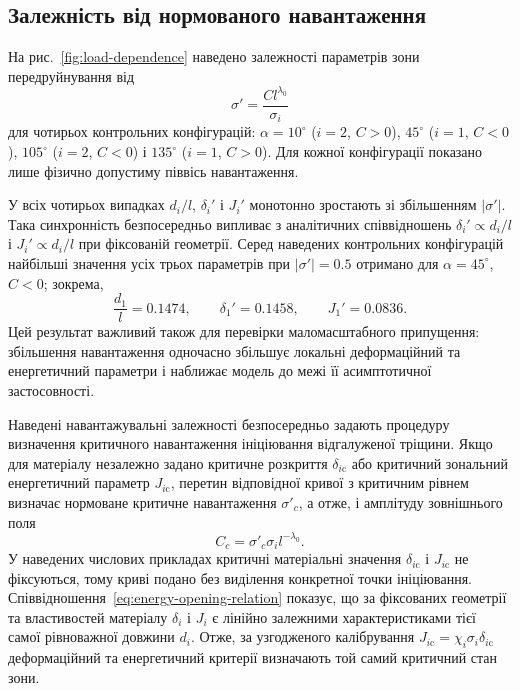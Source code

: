 \subsection{Залежність від нормованого навантаження}
\label{subsec:figure2}

На рис.~\ref{fig:load-dependence} наведено залежності параметрів зони
передруйнування від
\begin{equation*}
  \sigma'=\frac{Cl^{\lambda_0}}{\sigma_i}
\end{equation*}
для чотирьох контрольних конфігурацій:
$\alpha=10^\circ$ ($i=2$, $C>0$),
$45^\circ$ ($i=1$, $C<0$),
$105^\circ$ ($i=2$, $C<0$) і
$135^\circ$ ($i=1$, $C>0$). Для кожної конфігурації показано лише
фізично допустиму піввісь навантаження.


У всіх чотирьох випадках $d_i/l$, $\delta_i'$ і $J_i'$ монотонно
зростають зі збільшенням $|\sigma'|$. Така синхронність безпосередньо
випливає з аналітичних співвідношень
$\delta_i'\propto d_i/l$ і $J_i'\propto d_i/l$ при фіксованій
геометрії. Серед наведених контрольних конфігурацій найбільші значення
усіх трьох параметрів при $|\sigma'|=0.5$ отримано для
$\alpha=45^\circ$, $C<0$; зокрема,
\begin{equation*}
  \frac{d_1}{l}=0.1474,\qquad
  \delta_1'=0.1458,\qquad
  J_1'=0.0836.
\end{equation*}
Цей результат важливий також для перевірки маломасштабного припущення:
збільшення навантаження одночасно збільшує локальні деформаційний та
енергетичний параметри і наближає модель до межі її асимптотичної
застосовності.

Наведені навантажувальні залежності безпосередньо задають процедуру
визначення критичного навантаження ініціювання відгалуженої тріщини.
Якщо для матеріалу незалежно задано критичне розкриття
$\delta_{i\mathrm{c}}$ або критичний зональний енергетичний параметр
$J_{i\mathrm{c}}$, перетин відповідної кривої з критичним рівнем
визначає нормоване критичне навантаження $\sigma'_c$, а отже, і
амплітуду зовнішнього поля
\begin{equation*}
  C_c=\sigma'_c\sigma_i l^{-\lambda_0}.
\end{equation*}
У наведених числових прикладах критичні матеріальні значення
$\delta_{i\mathrm{c}}$ і $J_{i\mathrm{c}}$ не фіксуються, тому криві
подано без виділення конкретної точки ініціювання.
Співвідношення~\eqref{eq:energy-opening-relation} показує, що за
фіксованих геометрії та властивостей матеріалу $\delta_i$ і $J_i$ є
лінійно залежними характеристиками тієї самої рівноважної довжини $d_i$.
Отже, за узгодженого калібрування
$J_{i\mathrm{c}}=\chi_i\sigma_i\delta_{i\mathrm{c}}$
деформаційний та енергетичний критерії визначають той самий критичний
стан зони.

